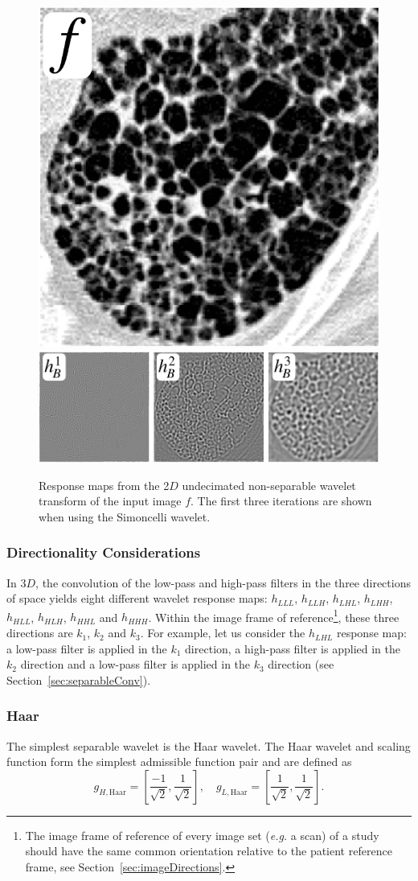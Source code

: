 \documentclass[fleqn,a4paper,oneside,openany]{book}
\begin{document}
%
\begin{figure}
\centering
\includegraphics[trim = 0 0 0 0, clip, width=0.2\linewidth]{f.png}\\
\includegraphics[trim = 0 0 0 0, clip, width=0.6\linewidth]{nonseparableWT.png}\\
\caption{Response maps from the 2$D$ undecimated non-separable wavelet transform of the input image $f$.
The first three iterations are shown when using the Simoncelli wavelet.}
  \label{fig:nonseparableWT}
\end{figure}
%
\subsubsection{Directionality Considerations}\label{sec:directionalityWT}
%
In 3$D$, the convolution of the low-pass and high-pass filters in the three directions of space yields eight different wavelet response maps:  $h_{LLL}$, $h_{LLH}$, $h_{LHL}$, $h_{LHH}$, $h_{HLL}$, $h_{HLH}$, $h_{HHL}$ and $h_{HHH}$. Within the image frame of reference\footnote{The image frame of reference of every image set (\textit{e.g.} a scan) of a study should have the same common orientation relative to the patient reference frame, see Section~\ref{sec:imageDirections}.}, these three directions are $k_1$, $k_2$ and $k_3$. For example, let us consider the $h_{LHL}$ response map: a low-pass filter is applied in the $k_1$ direction, a high-pass filter is applied in the $k_2$ direction and a low-pass filter is applied in the $k_3$ direction (see Section~\ref{sec:separableConv}).
%
\subsubsection{Haar}\label{sec:haar}
%
The simplest separable wavelet is the Haar wavelet.
The Haar wavelet and scaling function form the simplest admissible function pair and are defined as~\cite{Lee2018}
$$g_{H,\text{Haar}} = \left[ \frac{-1}{\sqrt{2}}, \frac{1}{\sqrt{2}}\right], \quad g_{L,\text{Haar}} = \left[ \frac{1}{\sqrt{2}}, \frac{1}{\sqrt{2}}\right].$$
\end{document}
